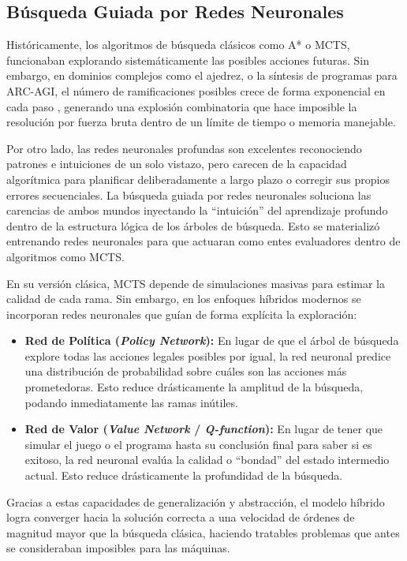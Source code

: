 \documentclass[11pt,a4paper,spanish]{book}
\numberwithin{equation}{chapter}
\numberwithin{figure}{chapter}
\begin{document}
\subsection{Búsqueda Guiada por Redes Neuronales}

Históricamente, los algoritmos de búsqueda clásicos como A* o MCTS, funcionaban explorando sistemáticamente las posibles acciones futuras.
Sin embargo, en dominios complejos como el ajedrez, o la síntesis de programas para ARC-AGI, el número de ramificaciones posibles crece de forma exponencial
en cada paso \cite{swiechowski2023monte}, generando una explosión combinatoria que hace imposible la resolución por fuerza bruta dentro de un límite de tiempo o memoria manejable.

Por otro lado, las redes neuronales profundas son excelentes reconociendo patrones e intuiciones de un solo vistazo,
pero carecen de la capacidad algorítmica para planificar deliberadamente a largo plazo o corregir sus propios errores secuenciales. La búsqueda guiada por redes
neuronales soluciona las carencias de ambos mundos inyectando la ``intuición'' del aprendizaje profundo dentro de la estructura lógica de los árboles de búsqueda. 
Esto se materializó entrenando redes neuronales para que actuaran como entes evaluadores dentro de algoritmos como MCTS.

En su versión clásica, MCTS depende de simulaciones masivas para estimar la calidad de cada rama. Sin embargo, en los enfoques híbridos modernos se incorporan redes neuronales que guían de forma explícita la exploración:

\begin{itemize}
	\item \textbf{Red de Política (\textit{Policy Network}):} En lugar de que el árbol de búsqueda explore todas las acciones legales posibles 
	por igual, la red neuronal predice una distribución de probabilidad sobre cuáles son las acciones más prometedoras. Esto 
	reduce drásticamente la amplitud de la búsqueda, podando inmediatamente las ramas inútiles.
	\item \textbf{Red de Valor (\textit{Value Network} / \textit{Q-function}):} En lugar de tener que simular el juego o el programa hasta su 
	conclusión final para saber si es exitoso, la red neuronal evalúa la calidad o ``bondad'' del estado intermedio actual. 
	Esto reduce drásticamente la profundidad de la búsqueda.
\end{itemize}

Gracias a estas capacidades de generalización y abstracción, el modelo híbrido logra converger hacia la solución correcta a
una velocidad de órdenes de magnitud mayor que la búsqueda clásica, haciendo tratables problemas que antes se consideraban 
imposibles para las máquinas.
\end{document}
